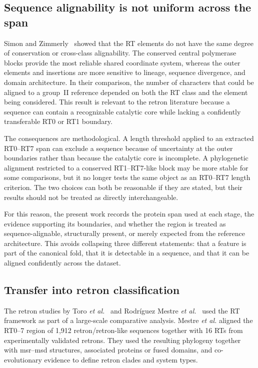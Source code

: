 \subsection{Sequence alignability is not uniform across the span}

Simon and Zimmerly~\cite{simon2008} showed that the RT elements do not have
the same degree of conservation or cross-class alignability. The conserved
central polymerase blocks provide the most reliable shared coordinate system,
whereas the outer elements and insertions are more sensitive to lineage,
sequence divergence, and domain architecture. In their comparison, the
number of characters that could be aligned to a group~II reference depended on
both the RT class and the element being considered. This result is relevant to
the retron literature because a sequence can contain a recognizable catalytic
core while lacking a confidently transferable RT0 or RT1 boundary.

The consequences are methodological. A length threshold applied to an
extracted RT0--RT7 span can exclude a sequence because of uncertainty at the
outer boundaries rather than because the catalytic core is incomplete. A
phylogenetic alignment restricted to a conserved RT1--RT7-like block may be
more stable for some comparisons, but it no longer tests the same object as an
RT0--RT7 length criterion. The two choices can both be reasonable if they are
stated, but their results should not be treated as directly interchangeable.

For this reason, the present work records the protein span used at each stage,
the evidence supporting its boundaries, and whether the region is treated as
sequence-alignable, structurally present, or merely expected from the
reference architecture. This avoids collapsing three different statements:
that a feature is part of the canonical fold, that it is detectable in a
sequence, and that it can be aligned confidently across the dataset.

\subsection{Transfer into retron classification}

The retron studies by Toro \textit{et al.}~\cite{toro2019} and Rodríguez
Mestre \textit{et al.}~\cite{mestre2020} used the RT framework as part of a
large-scale comparative analysis. Mestre \textit{et al.} aligned the RT0--7
region of 1,912 retron/retron-like sequences together with 16 RTs from
experimentally validated retrons. They used the resulting phylogeny together
with msr--msd structures, associated proteins or fused domains, and
co-evolutionary evidence to define retron clades and system types.


